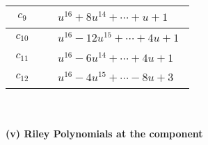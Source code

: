 \documentclass[1p]{elsarticle_modified}
\theoremstyle{definition}
\begin{document}
\begin{tabular}{m{50pt}|m{274pt}}
\hline $$\begin{aligned}c_{9}\end{aligned}$$&$\begin{aligned}
&u^{16}+8 u^{14}+\cdots+u+1
\end{aligned}$\\
\hline $$\begin{aligned}c_{10}\end{aligned}$$&$\begin{aligned}
&u^{16}-12 u^{15}+\cdots+4 u+1
\end{aligned}$\\
\hline $$\begin{aligned}c_{11}\end{aligned}$$&$\begin{aligned}
&u^{16}-6 u^{14}+\cdots+4 u+1
\end{aligned}$\\
\hline $$\begin{aligned}c_{12}\end{aligned}$$&$\begin{aligned}
&u^{16}-4 u^{15}+\cdots-8 u+3
\end{aligned}$\\
\hline
\end{tabular}\\~\\
\newpage\renewcommand{\arraystretch}{1}
\flushleft \textbf{(v) Riley Polynomials at the component}\newline \\
\end{document}
